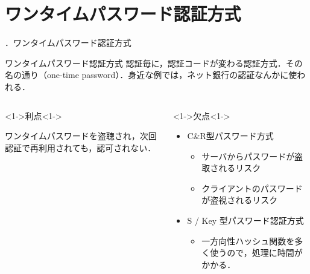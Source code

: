 \documentclass[aspectratio=43]{beamer}
\begin{document}
\section{ワンタイムパスワード認証方式}
\begin{frame}{\thesection ．ワンタイムパスワード認証方式}
    \begin{block}{ワンタイムパスワード認証方式}
        認証毎に，認証コードが変わる認証方式．その名の通り（one-time password）．身近な例では，ネット銀行の認証なんかに使われる．
    \end{block}
    \begin{columns}
        \begin{column}[t]{0.49\linewidth}
            \begin{block}<1->{利点}<1->
                \begin{minipage}[c][0.45\textheight]{\linewidth}
                    ワンタイムパスワードを盗聴され，次回認証で再利用されても，認可されない．
                \end{minipage}
            \end{block}
        \end{column}
        \begin{column}[t]{0.49\linewidth}
            \begin{block}<1->{欠点}<1->
                \begin{minipage}[c][0.45\textheight]{\linewidth}
                    \begin{itemize}
                        \item C\&R型パスワード方式
                              \begin{itemize}
                                  \item サーバからパスワードが盗取されるリスク
                                  \item クライアントのパスワードが盗視されるリスク
                              \end{itemize}
                        \item S / Key 型パスワード認証方式
                              \begin{itemize}
                                  \item 一方向性ハッシュ関数を多く使うので，処理に時間がかかる．
                              \end{itemize}
                    \end{itemize}
                \end{minipage}
            \end{block}
        \end{column}
    \end{columns}
\end{frame}
\end{document}
